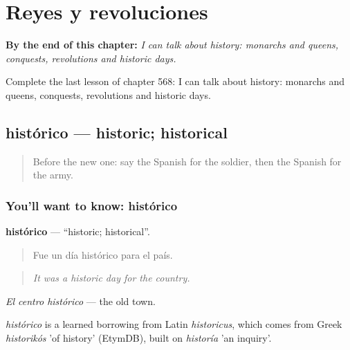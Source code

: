 
\chapter{Reyes y revoluciones}
\label{ch:es-reyes-y-revoluciones}

\begin{chapteropening}
\textbf{By the end of this chapter:} \emph{I can talk about history: monarchs and queens, conquests, revolutions and historic days.}

Complete the last lesson of chapter 568: I can talk about history: monarchs and queens, conquests, revolutions and historic days.
\end{chapteropening}

\section[histórico]{histórico — historic; historical}

\label{lesson:ES-C568-historico}



\begin{quote}
Before the new one: say the Spanish for the soldier, then the Spanish for the army.
\end{quote}

\subsection*{You'll want to know: histórico}
\textbf{histórico} — \textquotedblleft{}historic; historical\textquotedblright{}.

\begin{quote}
Fue un día histórico para el país.
\end{quote}

\begin{quote}
\emph{It was a historic day for the country.}
\end{quote}

\emph{El centro histórico} — the old town.

\begin{cousinweb}
\emph{histórico} is a learned borrowing from Latin \emph{historicus}, which comes from Greek \emph{historikós} 'of history' (EtymDB), built on \emph{historía} 'an inquiry'.
\end{cousinweb}

